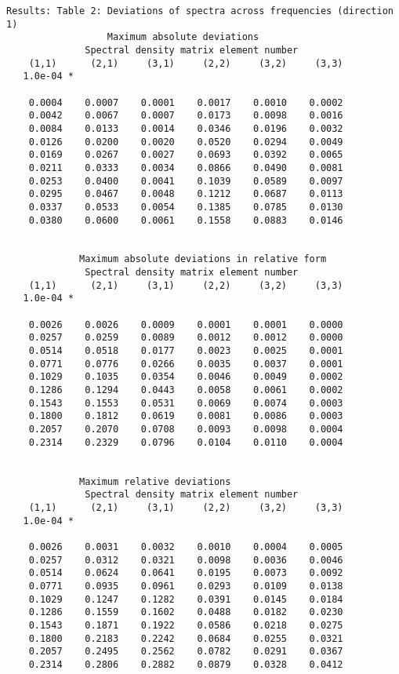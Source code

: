\documentclass{article}
\begin{document}
\begin{verbatim}
Results: Table 2: Deviations of spectra across frequencies (direction 1)
                  Maximum absolute deviations
              Spectral density matrix element number
    (1,1)      (2,1)     (3,1)     (2,2)     (3,2)     (3,3)
   1.0e-04 *

    0.0004    0.0007    0.0001    0.0017    0.0010    0.0002
    0.0042    0.0067    0.0007    0.0173    0.0098    0.0016
    0.0084    0.0133    0.0014    0.0346    0.0196    0.0032
    0.0126    0.0200    0.0020    0.0520    0.0294    0.0049
    0.0169    0.0267    0.0027    0.0693    0.0392    0.0065
    0.0211    0.0333    0.0034    0.0866    0.0490    0.0081
    0.0253    0.0400    0.0041    0.1039    0.0589    0.0097
    0.0295    0.0467    0.0048    0.1212    0.0687    0.0113
    0.0337    0.0533    0.0054    0.1385    0.0785    0.0130
    0.0380    0.0600    0.0061    0.1558    0.0883    0.0146


             Maximum absolute deviations in relative form
              Spectral density matrix element number
    (1,1)      (2,1)     (3,1)     (2,2)     (3,2)     (3,3)
   1.0e-04 *

    0.0026    0.0026    0.0009    0.0001    0.0001    0.0000
    0.0257    0.0259    0.0089    0.0012    0.0012    0.0000
    0.0514    0.0518    0.0177    0.0023    0.0025    0.0001
    0.0771    0.0776    0.0266    0.0035    0.0037    0.0001
    0.1029    0.1035    0.0354    0.0046    0.0049    0.0002
    0.1286    0.1294    0.0443    0.0058    0.0061    0.0002
    0.1543    0.1553    0.0531    0.0069    0.0074    0.0003
    0.1800    0.1812    0.0619    0.0081    0.0086    0.0003
    0.2057    0.2070    0.0708    0.0093    0.0098    0.0004
    0.2314    0.2329    0.0796    0.0104    0.0110    0.0004


             Maximum relative deviations
              Spectral density matrix element number
    (1,1)      (2,1)     (3,1)     (2,2)     (3,2)     (3,3)
   1.0e-04 *

    0.0026    0.0031    0.0032    0.0010    0.0004    0.0005
    0.0257    0.0312    0.0321    0.0098    0.0036    0.0046
    0.0514    0.0624    0.0641    0.0195    0.0073    0.0092
    0.0771    0.0935    0.0961    0.0293    0.0109    0.0138
    0.1029    0.1247    0.1282    0.0391    0.0145    0.0184
    0.1286    0.1559    0.1602    0.0488    0.0182    0.0230
    0.1543    0.1871    0.1922    0.0586    0.0218    0.0275
    0.1800    0.2183    0.2242    0.0684    0.0255    0.0321
    0.2057    0.2495    0.2562    0.0782    0.0291    0.0367
    0.2314    0.2806    0.2882    0.0879    0.0328    0.0412
\end{verbatim}
\end{document}

